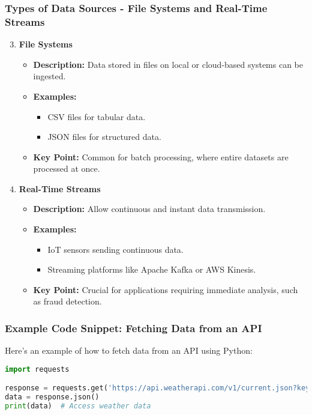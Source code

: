 \documentclass{beamer}
\begin{document}
\begin{frame}
    \frametitle{Types of Data Sources - File Systems and Real-Time Streams}
    \begin{enumerate}
        \setcounter{enumi}{2}
        \item \textbf{File Systems}
            \begin{itemize}
                \item \textbf{Description:} Data stored in files on local or cloud-based systems can be ingested.
                \item \textbf{Examples:}
                    \begin{itemize}
                        \item CSV files for tabular data.
                        \item JSON files for structured data.
                    \end{itemize}
                \item \textbf{Key Point:} Common for batch processing, where entire datasets are processed at once.
            \end{itemize}
        
        \item \textbf{Real-Time Streams}
            \begin{itemize}
                \item \textbf{Description:} Allow continuous and instant data transmission.
                \item \textbf{Examples:}
                    \begin{itemize}
                        \item IoT sensors sending continuous data.
                        \item Streaming platforms like Apache Kafka or AWS Kinesis.
                    \end{itemize}
                \item \textbf{Key Point:} Crucial for applications requiring immediate analysis, such as fraud detection.
            \end{itemize}
    \end{enumerate}
\end{frame}

\begin{frame}[fragile]
    \frametitle{Example Code Snippet: Fetching Data from an API}
    Here’s an example of how to fetch data from an API using Python:
    \begin{lstlisting}[language=Python]
import requests

response = requests.get('https://api.weatherapi.com/v1/current.json?key=YOUR_API_KEY&q=London')
data = response.json()
print(data)  # Access weather data
    \end{lstlisting}
\end{frame}
\end{document}
